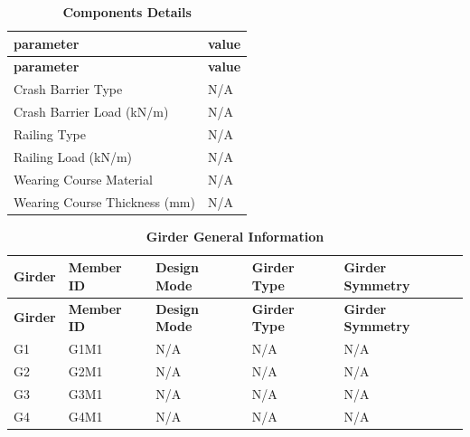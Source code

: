 \documentclass[12pt,a4paper]{report}
\numberwithin{table}{chapter}
\numberwithin{figure}{chapter}
\newcommand{\ReportTableSetup}{%
  \setlength{\tabcolsep}{3.0pt}%
  \renewcommand{\arraystretch}{1.18}%
  \setlength{\arrayrulewidth}{0.4pt}\setlength{\extrarowheight}{0.5pt}%
  \setlength{\LTleft}{\fill}\setlength{\LTright}{\fill}%
  \setlength{\LTpre}{4pt}\setlength{\LTpost}{8pt}}
\newcommand{\ReportTableFont}{\small}
\newcommand{\ReportRowGap}{3.0pt}
\newcommand{\ReportTableGap}{\vspace{0.5em}}
\begin{document}
\ReportTableGap

\begingroup
\ReportTableSetup
\ReportTableFont
\begin{longtable}{|L{5.5000cm}|p{10.0000cm}|}
\caption{\textbf{Components Details}}\\
\hline
\textbf{parameter} & \textbf{value} \\
\hline
\endfirsthead
\hline
\textbf{parameter} & \textbf{value} \\
\hline
\endhead
\hline
\endfoot
\hline
\endlastfoot

\textnormal{Crash Barrier Type} & N/A \\[\ReportRowGap]
\hline
\textnormal{Crash Barrier Load (kN/m)} & N/A \\[\ReportRowGap]
\hline

\textnormal{Railing Type} & N/A \\[\ReportRowGap]
\hline
\textnormal{Railing Load (kN/m)} & N/A \\[\ReportRowGap]
\hline
\textnormal{Wearing Course Material} & N/A \\[\ReportRowGap]
\hline
\textnormal{Wearing Course Thickness (mm)} & N/A \\[\ReportRowGap]
\hline
\end{longtable}
\endgroup


\ReportTableGap
\noindent
            
\ReportTableGap
\begingroup
\ReportTableSetup
\ReportTableFont
\begin{longtable}{|L{2.2000cm}|L{1.8000cm}|p{3.8000cm}|p{3.8000cm}|p{3.8000cm}|}
\caption{\textbf{Girder General Information}}\\
\hline
\textbf{Girder} & \textbf{Member ID} & \textbf{Design Mode} & \textbf{Girder Type} & \textbf{Girder Symmetry} \\[\ReportRowGap]
\hline
\endfirsthead
\hline
\textbf{Girder} & \textbf{Member ID} & \textbf{Design Mode} & \textbf{Girder Type} & \textbf{Girder Symmetry} \\[\ReportRowGap]
\hline
\endhead
\hline
\endfoot
\hline
\endlastfoot

G1 & G1M1 & N/A & N/A & N/A \\[\ReportRowGap]
\hline
G2 & G2M1 & N/A & N/A & N/A \\[\ReportRowGap]
\hline
G3 & G3M1 & N/A & N/A & N/A \\[\ReportRowGap]
\hline
G4 & G4M1 & N/A & N/A & N/A \\[\ReportRowGap]
\hline
\end{longtable}
\endgroup
\end{document}

